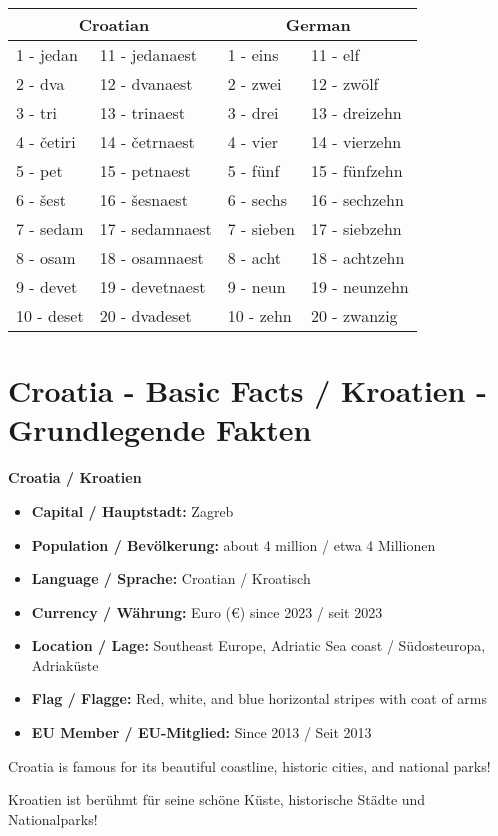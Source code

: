 \begin{vocabulary}
\begin{tabular}{llll}
\toprule
\multicolumn{2}{c}{Croatian} & \multicolumn{2}{c}{German} \\
\midrule
1 - jedan & 11 - jedanaest & 1 - eins & 11 - elf \\
2 - dva & 12 - dvanaest & 2 - zwei & 12 - zwölf \\
3 - tri & 13 - trinaest & 3 - drei & 13 - dreizehn \\
4 - četiri & 14 - četrnaest & 4 - vier & 14 - vierzehn \\
5 - pet & 15 - petnaest & 5 - fünf & 15 - fünfzehn \\
6 - šest & 16 - šesnaest & 6 - sechs & 16 - sechzehn \\
7 - sedam & 17 - sedamnaest & 7 - sieben & 17 - siebzehn \\
8 - osam & 18 - osamnaest & 8 - acht & 18 - achtzehn \\
9 - devet & 19 - devetnaest & 9 - neun & 19 - neunzehn \\
10 - deset & 20 - dvadeset & 10 - zehn & 20 - zwanzig \\
\bottomrule
\end{tabular}
\end{vocabulary}

\section{Croatia - Basic Facts / Kroatien - Grundlegende Fakten}

\begin{culture}
\textbf{Croatia / Kroatien}

\begin{itemize}
    \item \textbf{Capital / Hauptstadt:} Zagreb
    \item \textbf{Population / Bevölkerung:} about 4 million / etwa 4 Millionen
    \item \textbf{Language / Sprache:} Croatian / Kroatisch
    \item \textbf{Currency / Währung:} Euro (€) since 2023 / seit 2023
    \item \textbf{Location / Lage:} Southeast Europe, Adriatic Sea coast / Südosteuropa, Adriaküste
    \item \textbf{Flag / Flagge:} Red, white, and blue horizontal stripes with coat of arms
    \item \textbf{EU Member / EU-Mitglied:} Since 2013 / Seit 2013
\end{itemize}

Croatia is famous for its beautiful coastline, historic cities, and national parks!

Kroatien ist berühmt für seine schöne Küste, historische Städte und Nationalparks!
\end{culture}

